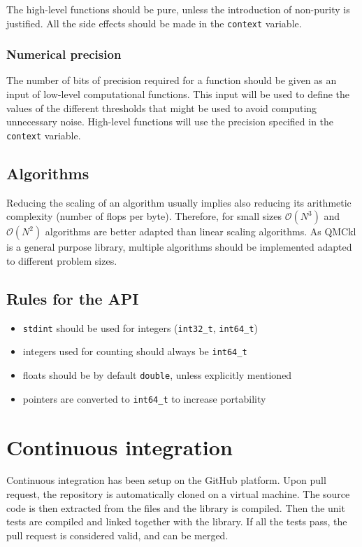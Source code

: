The high-level  functions should be pure,  unless the introduction
of non-purity is justified. All the side effects should be made in
the \texttt{context} variable.

\subsubsection{Numerical precision}

The number of bits of precision  required for a function should be
given as an input of low-level computational functions. This input
will be used to define the values of the different thresholds that
might be  used to  avoid computing unnecessary  noise.  High-level
functions  will  use  the  precision specified  in  the  \texttt{context}
variable.

\subsection{Algorithms}

Reducing the scaling of an  algorithm usually implies also reducing
its arithmetic  complexity (number  of flops per  byte). Therefore,
for  small  sizes   \(\mathcal{O}(N^3)\)  and  \(\mathcal{O}(N^2)\)
algorithms are  better adapted than linear  scaling algorithms.  As
\ac{QMCkl} is a  general purpose library, multiple  algorithms should be
implemented adapted to different problem sizes.

\subsection{Rules for the API}

\begin{itemize}
\item \texttt{stdint} should be used for integers (\texttt{int32\_t}, \texttt{int64\_t})
\item integers used for counting should always be \texttt{int64\_t}
\item floats should be by default \texttt{double}, unless explicitly mentioned
\item pointers are converted to \texttt{int64\_t} to increase portability
\end{itemize}

\section{Continuous integration}

Continuous integration has been setup on the GitHub platform. Upon
pull request, the repository is automatically cloned on a virtual
machine. The source code is then extracted from the {\orgmode}
files and the library is compiled. Then the unit tests are compiled
and linked together with the library. If all the tests pass, the
pull request is considered valid, and can be merged.

